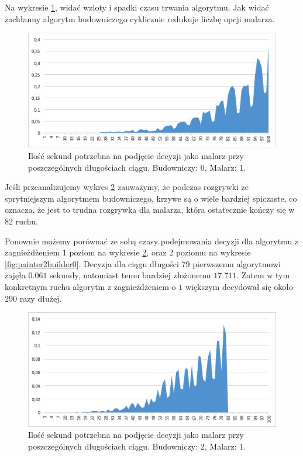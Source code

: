 \documentclass[document]{xmgr}
\begin{document}
Na wykresie \ref{fig:painter1builder0}, widać wzloty i spadki czasu trwania algorytmu. Jak widać zachłanny algorytm budowniczego cyklicznie redukuje liczbę opcji malarza.

\begin{figure}[h]
    \centering
    \includegraphics[scale = 0.7]{images/timePainter1Builder0}
    \caption{Ilość sekund potrzebna na podjęcie decyzji jako malarz przy poszczególnych długościach ciągu. Budowniczy: 0, Malarz: 1.}
    \label{fig:painter1builder0}
\end{figure}

Jeśli przeanalizujemy wykres \ref{fig:painter1builder2} zauważymy, że podczas rozgrywki ze sprytniejszym algorytmem budowniczego, krzywe są o wiele bardziej spiczaste, co oznacza, że jest to trudna rozgrywka dla malarza, która ostatecznie kończy się w 82 ruchu.

Ponownie możemy porównać ze sobą czasy podejmowania decyzji dla algorytmu z zagnieżdżeniem 1 poziom na wykresie \ref{fig:painter1builder2}, oraz 2 poziomu na wykresie \ref{fig:painter2builder0}. Decyzja dla ciągu długości 79 pierwszemu algorytmowi zajęła $0.061$ sekundy, natomiast temu bardziej złożonemu $17.711$. Zatem w tym konkretnym ruchu algorytm z zagnieżdżeniem o $1$ większym decydował się około $290$ razy dłużej.

\begin{figure}[h]
    \centering
    \includegraphics[scale = 0.7]{images/timePainter1Builder2}
    \caption{Ilość sekund potrzebna na podjęcie decyzji jako malarz przy poszczególnych długościach ciągu. Budowniczy: 2, Malarz: 1.}
    \label{fig:painter1builder2}
\end{figure}
\end{document}
